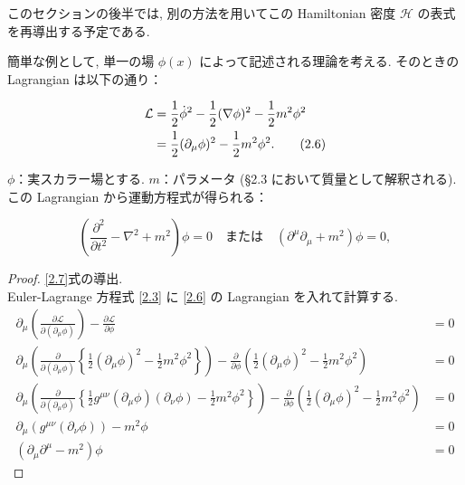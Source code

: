 \documentclass[a4paper,12pt]{article}
\begin{document}
このセクションの後半では, 別の方法を用いてこの Hamiltonian 密度 $\mathcal{H}$ の表式を再導出する予定である.

簡単な例として, 単一の場 $\phi(x)$ によって記述される理論を考える. そのときの Lagrangian は以下の通り：

\begin{align}\label{2.6}
    \mathcal{L} &= \frac{1}{2} \dot{\phi}^2 - \frac{1}{2} (\nabla \phi)^2 - \frac{1}{2} m^2 \phi^2 \notag \\
    &= \frac{1}{2} (\partial_\mu \phi)^2 - \frac{1}{2} m^2 \phi^2. \tag{2.6}
\end{align}

$\phi$：実スカラー場とする. $m$：パラメータ (§2.3 において質量として解釈される).\\
この Lagrangian から運動方程式が得られる：

\begin{equation*}\label{2.7}
\left( \frac{\partial^2}{\partial t^2} - \nabla^2 + m^2 \right) \phi = 0
\quad \text{または} \quad
\left( \partial^\mu \partial_\mu + m^2 \right) \phi = 0, \tag{2.7}
\end{equation*}

\color{blue}

\begin{proof}
\eqref{2.7}式の導出.\\
Euler-Lagrange 方程式 \eqref{2.3} に \eqref{2.6} の Lagrangian を入れて計算する.
\begin{align*}
    \partial_\mu \left( \frac{\partial \mathcal{L}}{\partial (\partial_\mu \phi)} \right) - \frac{\partial \mathcal{L}}{\partial \phi} &= 0 \tag{2-2.b1}\\
    \partial_\mu \left( \frac{\partial}{\partial (\partial_\mu \phi)} \left\{ \frac{1}{2} (\partial_\mu \phi)^2 - \frac{1}{2} m^2 \phi^2 \right\} \right) - \frac{\partial}{\partial \phi} \left( \frac{1}{2} (\partial_\mu \phi)^2 - \frac{1}{2} m^2 \phi^2 \right) &= 0 \tag{2-2.b2}\\
    \partial_\mu \left( \frac{\partial}{\partial (\partial_\mu \phi)} \left\{ \frac{1}{2} g^{\mu\nu}(\partial_\mu \phi)(\partial_\nu \phi) - \frac{1}{2} m^2 \phi^2 \right\} \right) - \frac{\partial}{\partial \phi} \left( \frac{1}{2} (\partial_\mu \phi)^2 - \frac{1}{2} m^2 \phi^2 \right) &= 0 \tag{2-2.b2}\\
    \partial_\mu \left( g^{\mu\nu}(\partial_\nu \phi) \right) - m^2 \phi &= 0 \tag{2-2.b3}\\
    (\partial_\mu \partial^\mu -m^2) \phi &= 0 \tag{2-2.b4}
\end{align*}

\end{proof}
\end{document}
